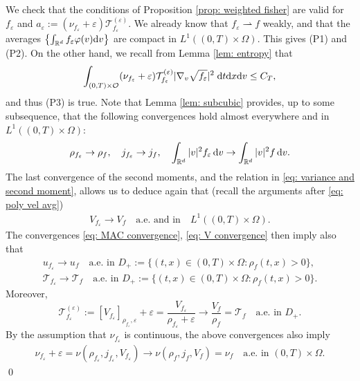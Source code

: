 \documentclass[10pt, reqno]{amsart}
\theoremstyle{plain}
\theoremstyle{definition}
\theoremstyle{remark}
\renewenvironment{proof}[1][\proofname]{\noindent{\scshape #1.\quad}}{\qed}
\numberwithin{equation}{section}
\newcommand{\calO}{\mathcal O}
\newcommand{\calT}{\mathcal T}
\newcommand{\R}{\mathbb{R}}
\newcommand{\ve}{\varepsilon}
\newcommand{\dx}{\textnormal{d}x}
\newcommand{\dv}{\textnormal{d}v}
\newcommand{\dt}{\textnormal{d}t}
\newcommand{\weakto}{\rightharpoonup}
\newcommand{\lt}{\left}
\newcommand{\rt}{\right}
\newcommand{\intr}{\int_{\R^d}}
\newcommand{\renorm}[3]{\lt[#1\rt]_{#2 , #3}}
\begin{document}
\begin{proof}
    We check that the conditions of Proposition \ref{prop: weighted fisher} are valid for $f_\ve$ and $a_\ve := (\nu_{f_\ve} + \ve) \calT_{f_\ve}^{(\ve)}$. We already know that $f_\ve\weakto f$ weakly, and that the averages $\lt\{\intr f_\ve \varphi(v)\dv\rt\}$ are compact in $L^1((0,T)\times\Omega)$. This gives (P1) and (P2). On the other hand, we recall from Lemma \ref{lem: entropy} that
\[
        \int_{(0,T)\times\calO} (\nu_{f_\ve} + \ve) \calT_{f_\ve}^{(\ve)} |\nabla_v \sqrt{f_\ve}|^2 \;\dt\dx\dv \le C_T,
\]
    and thus (P3) is true. Note that Lemma \ref{lem: subcubic} provides, up to some subsequence, that the following convergences hold almost everywhere and in $L^1((0,T)\times \Omega)$:
    \begin{equation} \label{eq: MAC convergence}
        \rho_{f_\ve} \to \rho_f, \quad j_{f_\ve} \to j_f, \quad  \intr |v|^2 f_\ve \,\dv \to \intr |v|^2 f \,\dv.
    \end{equation}
    The last convergence of the second moments, and the relation in \eqref{eq: variance and second moment}, allows us to deduce again that (recall the arguments after \eqref{eq: poly vel avg})
    \begin{align}\label{eq: V convergence}
        V_{f_\ve} \to V_f \quad \text{a.e. and in}\quad L^1((0,T)\times\Omega).
    \end{align}
    The convergences \eqref{eq: MAC convergence}, \eqref{eq: V convergence} then imply also that
    \begin{equation} \label{eq: U T convergence}
    \begin{split}
        u_{f_\ve} \to u_f \quad \text{a.e. in } D_+ := \{(t,x)\in (0,T)\times \Omega : \rho_f(t,x) > 0\}, \\
        \calT_{f_\ve} \to \calT_f \quad \text{a.e. in } D_+ := \{(t,x)\in (0,T)\times \Omega : \rho_f(t,x) > 0\}.
    \end{split}
    \end{equation}
    Moreover,
    \begin{equation} \label{eq: Tve convergence}
        \calT_{f_{\ve}}^{(\ve)} := \renorm{V_{f_\ve}}{\rho_{f_\ve}}{\ve} + \ve = \frac{V_{f_\ve}}{\rho_{f_\ve} + \ve} \to \frac{V_f}{\rho_f} = \calT_f \quad \text{a.e. in }D_+.
    \end{equation}
    By the assumption that $\nu_{f_\ve}$ is continuous, the above convergences also imply
    \begin{align}\label{eq: NU convergence}
        \nu_{f_\ve} + \ve = \nu(\rho_{f_\ve}, j_{f_\ve}, V_{f_\ve}) \to \nu(\rho_f, j_f, V_f) = \nu_f  \quad \text{a.e. in }(0,T)\times \Omega.

\end{align}
\end{proof}
\end{document}
